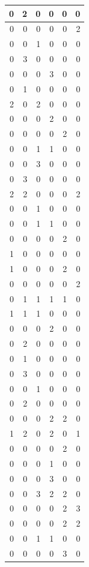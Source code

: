 \documentclass[
  12pt,
]{krantz}
\begin{document}
\begin{tabular}{r|r|r|r|r|r}
\hline
0 & 2 & 0 & 0 & 0 & 0\\
\hline
0 & 0 & 0 & 0 & 0 & 2\\
\hline
0 & 0 & 1 & 0 & 0 & 0\\
\hline
0 & 3 & 0 & 0 & 0 & 0\\
\hline
0 & 0 & 0 & 3 & 0 & 0\\
\hline
0 & 1 & 0 & 0 & 0 & 0\\
\hline
2 & 0 & 2 & 0 & 0 & 0\\
\hline
0 & 0 & 0 & 2 & 0 & 0\\
\hline
0 & 0 & 0 & 0 & 2 & 0\\
\hline
0 & 0 & 1 & 1 & 0 & 0\\
\hline
0 & 0 & 3 & 0 & 0 & 0\\
\hline
0 & 3 & 0 & 0 & 0 & 0\\
\hline
2 & 2 & 0 & 0 & 0 & 2\\
\hline
0 & 0 & 1 & 0 & 0 & 0\\
\hline
0 & 0 & 1 & 1 & 0 & 0\\
\hline
0 & 0 & 0 & 0 & 2 & 0\\
\hline
1 & 0 & 0 & 0 & 0 & 0\\
\hline
1 & 0 & 0 & 0 & 2 & 0\\
\hline
0 & 0 & 0 & 0 & 0 & 2\\
\hline
0 & 1 & 1 & 1 & 1 & 0\\
\hline
1 & 1 & 1 & 0 & 0 & 0\\
\hline
0 & 0 & 0 & 2 & 0 & 0\\
\hline
0 & 2 & 0 & 0 & 0 & 0\\
\hline
0 & 1 & 0 & 0 & 0 & 0\\
\hline
0 & 3 & 0 & 0 & 0 & 0\\
\hline
0 & 0 & 1 & 0 & 0 & 0\\
\hline
0 & 2 & 0 & 0 & 0 & 0\\
\hline
0 & 0 & 0 & 2 & 2 & 0\\
\hline
1 & 2 & 0 & 2 & 0 & 1\\
\hline
0 & 0 & 0 & 0 & 2 & 0\\
\hline
0 & 0 & 0 & 1 & 0 & 0\\
\hline
0 & 0 & 0 & 3 & 0 & 0\\
\hline
0 & 0 & 3 & 2 & 2 & 0\\
\hline
0 & 0 & 0 & 0 & 2 & 3\\
\hline
0 & 0 & 0 & 0 & 2 & 2\\
\hline
0 & 0 & 1 & 1 & 0 & 0\\
\hline
0 & 0 & 0 & 0 & 3 & 0\\

\end{tabular}
\end{document}

